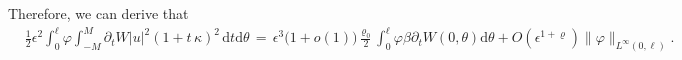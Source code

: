 \documentclass[10pt, reqno]{amsart}
\numberwithin{equation}{section}
\theoremstyle{definition}
\begin{document}
{{%
Therefore, we can derive that
\begin{align}\label{inedtitiesterm5}
 &\frac{1}{2}\epsilon^2\int_0^\ell \varphi \int_{-M}^{M} \partial_t W |u|^2
 (1+t\,\kappa)^2\,{\mathrm d}t{\mathrm d}\theta
\,=\,
  \epsilon^3\big(1+o(1)\big)\frac{\varrho_0}{2}
 \int_0^\ell \varphi \beta
 \partial_t W(0, \theta){\mathrm d}\theta + O( \epsilon^{1+\varrho}) \|\varphi\|_{L^\infty(0,\ell)}.
\end{align}




}}
\end{document}
